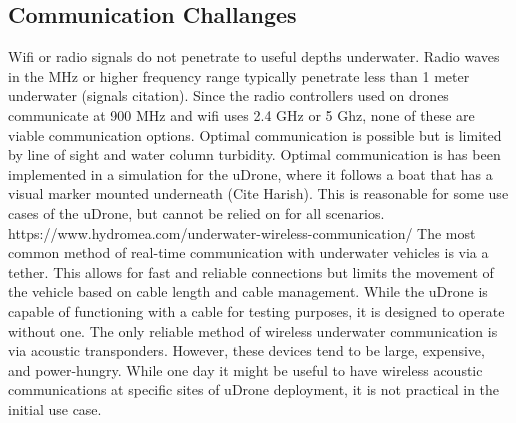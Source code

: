 \subsection{Communication Challanges}
Wifi or radio signals do not penetrate to useful depths underwater. Radio waves in the MHz or higher frequency range typically penetrate less than 1 meter underwater (signals citation). Since the radio controllers used on drones communicate at 900 MHz and wifi uses 2.4 GHz or 5 Ghz, none of these are viable communication options. 
Optimal communication is possible but is limited by line of sight and water column turbidity. Optimal communication is has been implemented in a simulation for the uDrone, where it follows a boat that has a visual marker mounted underneath (Cite Harish). This is reasonable for some use cases of the uDrone, but cannot be relied on for all scenarios.
https://www.hydromea.com/underwater-wireless-communication/
The most common method of real-time communication with underwater vehicles is via a tether. This allows for fast and reliable connections but limits the movement of the vehicle based on cable length and cable management. While the uDrone is capable of functioning with a cable for testing purposes, it is designed to operate without one. 
The only reliable method of wireless underwater communication is via acoustic transponders. However, these devices tend to be large, expensive, and power-hungry. While one day it might be useful to have wireless acoustic communications at specific sites of uDrone deployment, it is not practical in the initial use case.

